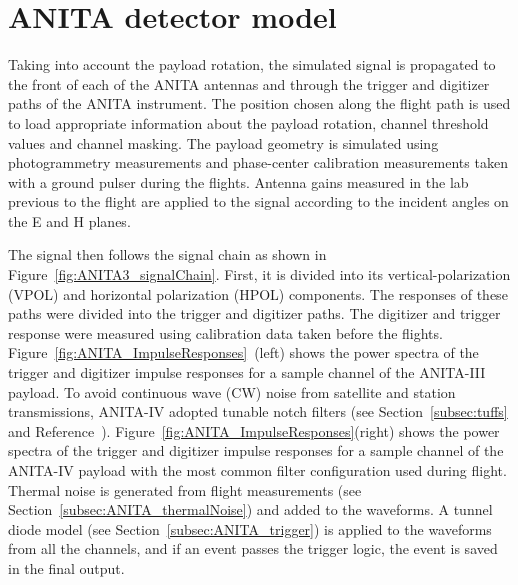 \section{ANITA detector model}
\label{sec:ANITA}
Taking into account the payload rotation, the simulated signal is
propagated to the front of each of the ANITA antennas and through the trigger and digitizer paths of the ANITA instrument.
The position chosen along the flight path is used to load appropriate information about the payload rotation, channel threshold values and channel masking.
The payload geometry is simulated using photogrammetry measurements
and phase-center calibration measurements taken with a ground pulser
during the flights.
Antenna gains measured in the lab previous to the flight are
applied to the signal according to the incident angles on the E and H planes. 

The signal then follows the signal chain as shown in
Figure~\ref{fig:ANITA3_signalChain}.
First, it is divided into its vertical-polarization (VPOL) and horizontal polarization (HPOL) components. 
The responses of these paths were divided into the trigger and digitizer
paths.
The digitizer and trigger response were measured using calibration data taken before
the flights. 
Figure~\ref{fig:ANITA_ImpulseResponses}~(left) shows the
power spectra of the trigger and digitizer impulse responses for a
sample channel of the ANITA-III payload.
To avoid continuous wave (CW) noise from satellite and station transmissions, ANITA-IV adopted 
tunable notch filters (see Section~\ref{subsec:tuffs} and Reference~\cite{Allison:2017vtk}).
Figure~\ref{fig:ANITA_ImpulseResponses}(right) shows the
power spectra of the trigger and digitizer impulse responses for a
sample channel of the ANITA-IV payload with the most common filter configuration used during flight.
Thermal noise is generated from flight measurements (see Section~\ref{subsec:ANITA_thermalNoise}) and added to the waveforms.
A tunnel diode model (see Section~\ref{subsec:ANITA_trigger}) is applied to the waveforms from all the channels, and if an event passes the trigger logic, the event is saved in the final output.

